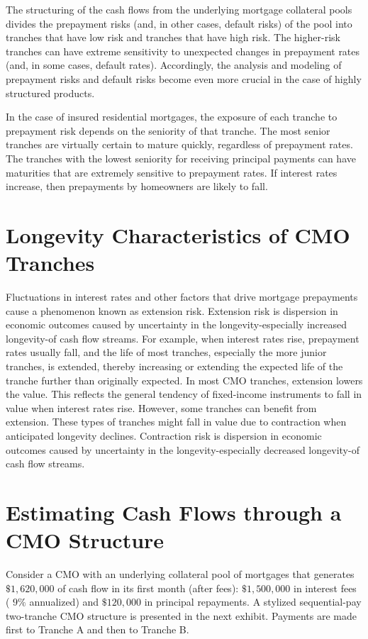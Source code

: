 \documentclass[11pt]{article}
\begin{document}
The structuring of the cash flows from the underlying mortgage collateral pools divides the prepayment risks (and, in other cases, default risks) of the pool into tranches that have low risk and tranches that have high risk. The higher-risk tranches can have extreme sensitivity to unexpected changes in prepayment rates (and, in some cases, default rates). Accordingly, the analysis and modeling of prepayment risks and default risks become even more crucial in the case of highly structured products.

In the case of insured residential mortgages, the exposure of each tranche to prepayment risk depends on the seniority of that tranche. The most senior tranches are virtually certain to mature quickly, regardless of prepayment rates. The tranches with the lowest seniority for receiving principal payments can have maturities that are extremely sensitive to prepayment rates. If interest rates increase, then prepayments by homeowners are likely to fall.

\section*{Longevity Characteristics of CMO Tranches}
Fluctuations in interest rates and other factors that drive mortgage prepayments cause a phenomenon known as extension risk. Extension risk is dispersion in economic outcomes caused by uncertainty in the longevity-especially increased longevity-of cash flow streams. For example, when interest rates rise, prepayment rates usually fall, and the life of most tranches, especially the more junior tranches, is extended, thereby increasing or extending the expected life of the tranche further than originally expected. In most CMO tranches, extension lowers the value. This reflects the general tendency of fixed-income instruments to fall in value when interest rates rise. However, some tranches can benefit from extension. These types of tranches might fall in value due to contraction when anticipated longevity declines. Contraction risk is dispersion in economic outcomes caused by uncertainty in the longevity-especially decreased longevity-of cash flow streams.

\section*{Estimating Cash Flows through a CMO Structure}
Consider a CMO with an underlying collateral pool of mortgages that generates $\$ 1,620,000$ of cash flow in its first month (after fees): $\$ 1,500,000$ in interest fees ( $9 \%$ annualized) and $\$ 120,000$ in principal repayments. A stylized sequential-pay two-tranche CMO structure is presented in the next exhibit. Payments are made first to Tranche A and then to Tranche B.
\end{document}
